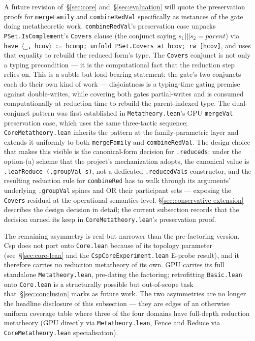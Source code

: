 \documentclass[acmsmall,screen,review,anonymous,nonacm]{acmart}
\begin{document}
A future revision of~\S\ref{sec:core} and~\S\ref{sec:evaluation} will quote the preservation proofs for \texttt{mergeFamily} and \texttt{combineRedVal} specifically as instances of the gate doing metatheoretic work. \texttt{combineRedVal}'s preservation case unpacks \texttt{PSet.IsComplement}'s \texttt{Covers} clause (the conjunct saying $s_1 \mathbin{|||} s_2 = \mathit{parent}$) via \texttt{have \ensuremath{\langle}\_,\,hcov\ensuremath{\rangle} := hcomp; unfold PSet.Covers at hcov; rw [hcov]}, and uses that equality to rebuild the reduced form's type. The \texttt{Covers} conjunct is not only a typing precondition --- it is the computational fact that the reduction step relies on. This is a subtle but load-bearing statement: the gate's two conjuncts each do their own kind of work --- disjointness is a typing-time gating premise against double-writes, while covering both gates partial-writes and is consumed computationally at reduction time to rebuild the parent-indexed type. The dual-conjunct pattern was first established in \texttt{Metatheory.lean}'s GPU \texttt{mergeVal} preservation case, which uses the same three-tactic sequence; \texttt{CoreMetatheory.lean} inherits the pattern at the family-parametric layer and extends it uniformly to both \texttt{mergeFamily} and \texttt{combineRedVal}. The design choice that makes this visible is the canonical-form decision for \texttt{.reduced\;s}: under the option-(a) scheme that the project's mechanization adopts, the canonical value is \texttt{.leafReduce (.groupVal s)}, not a dedicated \texttt{.reducedVal\;s} constructor, and the resulting reduction rule for \texttt{combineRed} has to walk through its arguments' underlying \texttt{.groupVal} spines and OR their participant sets --- exposing the \texttt{Covers} residual at the operational-semantics level. \S\ref{sec:conservative-extension} describes the design decision in detail; the current subsection records that the decision earned its keep in \texttt{CoreMetatheory.lean}'s preservation proof.

The remaining asymmetry is real but narrower than the pre-factoring version. Csp does not port onto \texttt{Core.lean} because of its topology parameter (see~\S\ref{sec:core-lean} and the \texttt{CspCoreExperiment.lean} E-probe result), and it therefore carries no reduction metatheory of its own. GPU carries its full standalone \texttt{Metatheory.lean}, pre-dating the factoring; retrofitting \texttt{Basic.lean} onto \texttt{Core.lean} is a structurally possible but out-of-scope task that~\S\ref{sec:conclusion} marks as future work. The two asymmetries are no longer the headline disclosure of this subsection --- they are edges of an otherwise uniform coverage table where three of the four domains have full-depth reduction metatheory (GPU directly via \texttt{Metatheory.lean}, Fence and Reduce via \texttt{CoreMetatheory.lean} specialisation).
\end{document}

